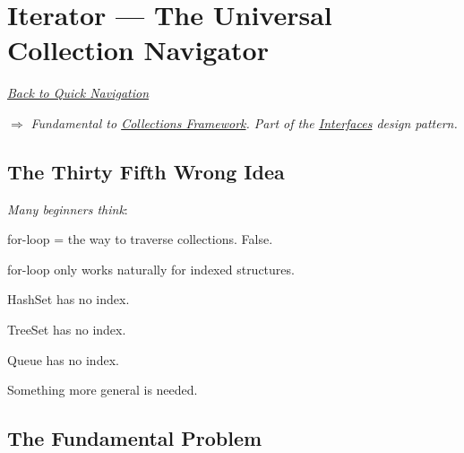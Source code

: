 \documentclass[11pt,a4paper]{book}
\begin{document}
\chapter{Iterator --- The Universal Collection Navigator}

\smallskip
\noindent
\hyperref[sec:quick_nav]{\emph{Back to Quick Navigation}}

\smallskip
\noindent
\textcolor{RosettaRoyalPurple}{$\Rightarrow$}
\emph{Fundamental to \hyperref[chap:collections]{Collections Framework}. Part of the \hyperref[chap:interfaces]{Interfaces} design pattern.}


\section{The Thirty Fifth Wrong Idea}

\begin{trap}

\emph{Many beginners think}:

for-loop = the way to traverse collections.
\textcolor{RosettaOrange}{False}.


for-loop only works naturally
for indexed structures.


HashSet has no index.


TreeSet has no index.


Queue has no index.


Something more general is needed.

\end{trap}


\section{The Fundamental Problem}
\end{document}
